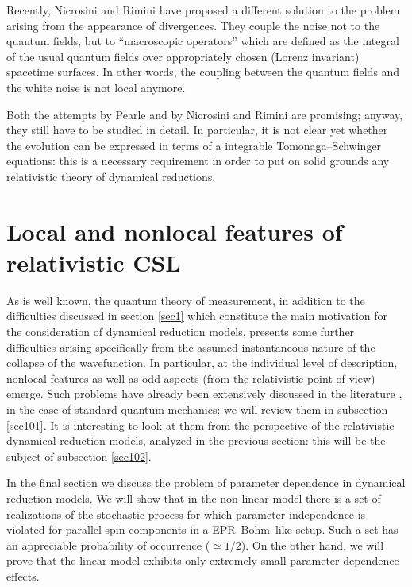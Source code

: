 \documentclass[10pt,a4paper]{article}
\begin{document}
Recently, Nicrosini and Rimini \cite{bgrel} have proposed a
different solution to the  problem arising from the appearance of
divergences. They couple the noise not to the quantum fields, but to
``macroscopic operators'' which are defined as the integral of the usual
quantum fields over appropriately chosen (Lorenz invariant) spacetime
surfaces. In other words, the coupling between the quantum fields and the
white noise is not local anymore.

Both the attempts by Pearle and by Nicrosini and Rimini are
promising; anyway, they still have to be studied in detail. In
particular, it is not clear yet whether the evolution can be
expressed in terms of a integrable Tomonaga--Schwinger  equations:
this is a necessary requirement in order to put on solid grounds
any relativistic theory of dynamical reductions.



\section{Local and nonlocal features of relativistic CSL}
\label{sec10}

As is well known, the quantum theory of measurement, in addition
to the difficulties discussed in section \ref{sec1} which
constitute the main motivation for the consideration of dynamical
reduction models, presents some further difficulties arising
specifically from the assumed instantaneous nature of the collapse
of the wavefunction. In particular, at the individual level of
description, nonlocal features as well as odd aspects (from the
relativistic point of view) emerge. Such problems have already
been extensively discussed in the literature
\cite{de,bl1,hkd,aa1}, in the case of standard quantum mechanics:
we will review them in subsection \ref{sec101}. It is interesting
to look at them from the perspective of the relativistic dynamical
reduction models, analyzed in the previous section: this will be
the subject of subsection \ref{sec102}.

In the final section we discuss the problem of parameter
dependence in dynamical reduction models. We will show that in the
non linear model there is a set of realizations of the stochastic
process for which parameter independence is violated for parallel
spin components in a EPR--Bohm--like setup. Such a set has an
appreciable probability of occurrence ($\simeq 1/2$). On the other
hand, we will prove that the linear model exhibits only extremely
small parameter dependence effects.
\end{document}
